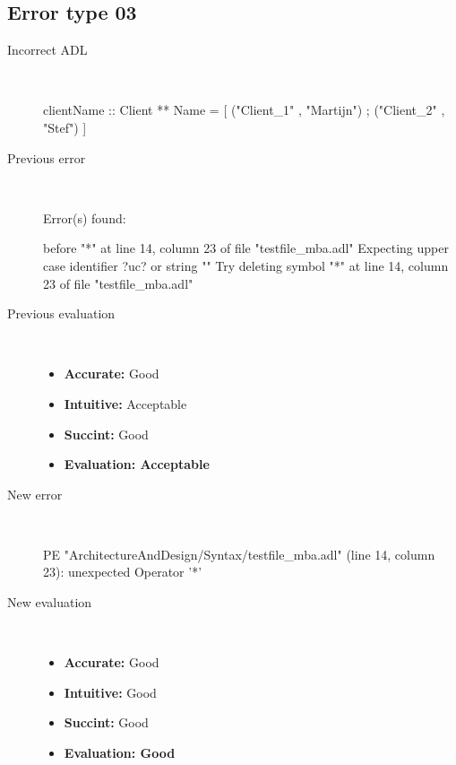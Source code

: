 \subsection{Error type 03}
  \begin{description}
  \item[Incorrect ADL]~\\
\begin{adl}
clientName :: Client ** Name =
    [ ("Client_1"      , "Martijn")
    ; ("Client_2"      , "Stef")
    ]\end{adl}
  \item[Previous error]~\\
\begin{haskell}
Error(s) found:

before "*" at line 14, column 23 of file "testfile_mba.adl"
Expecting upper case identifier ?uc? or string ""
Try deleting symbol "*" at line 14, column 23 of file "testfile_mba.adl"\end{haskell}
  \item[Previous evaluation]~\\
    \begin{itemize}
    \item \textbf{Accurate:} Good
    \item \textbf{Intuitive:} Acceptable
    \item \textbf{Succint:} Good
    \item \textbf{Evaluation: Acceptable}
    \end{itemize}
  \item[New error]~\\
\begin{haskell}
PE "ArchitectureAndDesign/Syntax/testfile_mba.adl" (line 14, column 23):
unexpected Operator '*'\end{haskell}
  \item[New evaluation]~\\
    \begin{itemize}
    \item \textbf{Accurate:} Good
    \item \textbf{Intuitive:} Good
    \item \textbf{Succint:} Good
    \item \textbf{Evaluation: Good
}
    \end{itemize}
  \end{description}

\hrulefill

